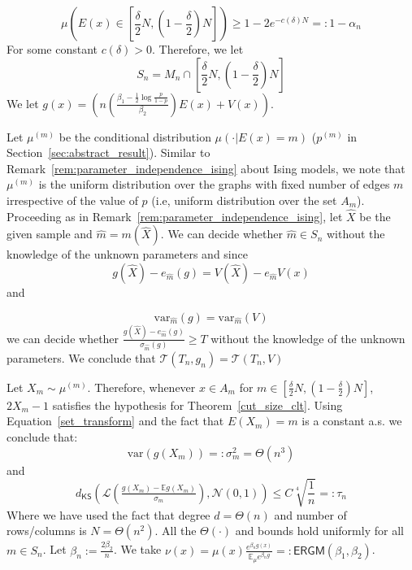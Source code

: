 \documentclass[final,12pt]{colt2018}
\begin{document}
$$\mu\left(E(x) \in \left[\frac{\delta}{2}N,\left(1-\frac{\delta}{2}\right)N\right]\right) \geq 1 - 2e^{-c(\delta)N} =: 1- \alpha_n$$
For some constant $c(\delta) > 0$. Therefore, we let 
$$S_n = M_n \cap \left[\frac{\delta}{2}N,\left(1-\frac{\delta}{2}\right)N\right]$$
We let $g(x) = \left(n\left(\frac{\beta_1 -\frac{1}{2}\log{\frac{p}{1-p}}}{\beta_2}\right)E(x) + V(x)\right)$.

\begin{remark}
Let $\mu^{(m)}$ be the conditional distribution $\mu(\cdot| E(x) = m)$ ($p^{(m)}$ in Section~\ref{sec:abstract_result}). Similar to Remark~\ref{rem:parameter_independence_ising} about Ising models, we note that $\mu^{(m)} $ is the uniform distribution over the graphs with fixed number of edges $m$ irrespective of the value of $p$ (i.e, uniform distribution over the set $A_m$). Proceeding as in Remark~\ref{rem:parameter_independence_ising}, let $\hat{X}$ be the given sample and $\hat{m} = m(\hat{X})$. We can decide whether $\hat{m} \in S_n$ without the knowledge of the unknown parameters and since
$$g(\hat{X}) - e_{\hat{m}}(g) = V(\hat{X}) - e_{\hat{m}}V(x)$$ and

$$\mathrm{var}_{\hat{m}}(g) = \mathrm{var}_{\hat{m}}(V)$$ 
we can decide whether $\frac{g(\hat{X}) - e_{\hat{m}}(g)}{\sigma_{\hat{m}}(g)} \geq T$ without the knowledge of the unknown parameters. We conclude that $\mathcal{T}(T_n,g_n) = \mathcal{T}(T_n,V)$
\label{rem:parameter_independence_ergm}
\end{remark}

Let $X_m \sim \mu^{(m)}$. Therefore, whenever $x \in A_m$ for $m \in \left[\frac{\delta}{2}N,\left(1-\frac{\delta}{2}\right)N\right] $, $2X_m -1$ satisfies the hypothesis for Theorem~\ref{cut_size_clt}. Using Equation~\eqref{set_transform} and the fact that $E(X_m) = m$ is a constant a.s. we conclude that:  
$$\mathrm{var}\left(g(X_m)\right) =: \sigma_m^2 = \Theta(n^3)$$
and
$$d_{\mathsf{KS}}\left(\mathcal{L}\left(\tfrac{g(X_m) - \mathbb{E}g(X_m)}{\sigma_m}\right),\mathcal{N}(0,1)\right) \leq C\sqrt[4]{\frac{1}{n}} =: \tau_n$$
Where we have used the fact that degree $d = \Theta(n)$ and number of rows/columns is $N = \Theta(n^2)$. All the $\Theta(\cdot)$ and bounds hold uniformly for all $m \in S_n$. Let $\beta_n := \frac{2\beta_2}{n}$. We take $\nu(x) = \mu(x)\frac{e^{\beta_n g(x)}}{\mathbb{E}_{\mu}e^{\beta_n g}} =: \mathsf{ERGM}(\beta_1,\beta_2)$.
\end{document}

